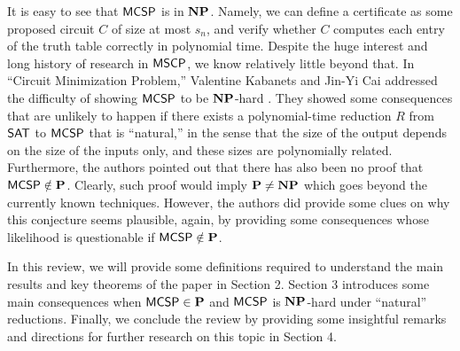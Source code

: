 \documentclass[11pt]{article}
\begin{document}
It is easy to see that $\mathsf{MCSP}$ is in $\mathbf{NP}$. Namely, we can define a certificate as some proposed circuit $C$ of size at most $s_n$, and verify whether $C$ computes each entry of the truth table correctly in polynomial time.
%
Despite the huge interest and long history of research in $\mathsf{MSCP}$,
we know relatively little beyond that.
%
In ``Circuit Minimization Problem,'' Valentine Kabanets and Jin-Yi Cai addressed the difficulty of showing $\mathsf{MCSP}$ to be $\mathbf{NP}$-hard \cite{10.1145/335305.335314}. They showed some consequences that are unlikely to happen if there exists a polynomial-time reduction $R$ from $\mathsf{SAT}$ to $\mathsf{MCSP}$ that is ``natural,'' in the sense that the size of the output depends on the size of the inputs only, and these sizes are polynomially related. Furthermore, the authors pointed out that there has also been no proof that $\mathsf{MCSP} \notin \mathbf{P}$. Clearly, such proof would imply $\mathbf{P} \neq \mathbf{NP}$ which goes beyond the currently known techniques. However, the authors did provide some clues on why this conjecture seems plausible, again, by providing some consequences whose likelihood is questionable if $\mathsf{MCSP} \notin \mathbf{P}$.

In this review, we will provide some definitions required to understand the main results and key theorems of the paper in Section 2. Section 3 introduces some main consequences when $\mathsf{MCSP} \in \mathbf{P}$ and $\mathsf{MCSP}$ is $\mathbf{NP}$-hard under ``natural'' reductions. Finally, we conclude the review by providing some insightful remarks and directions for further research on this topic in Section 4.


%



\end{document}

